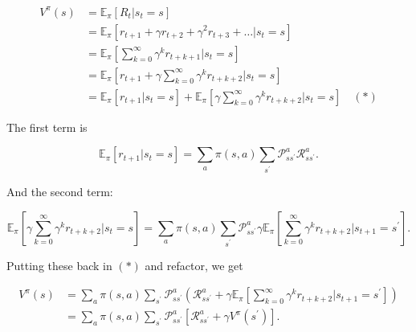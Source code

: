 \documentclass[12pt]{article}
\theoremstyle{plain}
\theoremstyle{definition}
\theoremstyle{remark}
\begin{document}
\begin{align*}
V ^ { \pi } ( s ) &= \mathbb { E } _ { \pi } \left[ R _ { t } | s _ { t } = s \right] \\
&= \mathbb { E } _ { \pi } \left[ r _ { t + 1 } + \gamma r _ { t + 2 } + \gamma ^ { 2 } r _ { t + 3 } + \ldots | s _ { t } = s \right] \\
&= \mathbb { E } _ { \pi } \left[ \sum _ { k = 0 } ^ { \infty } \gamma ^ { k } r _ { t + k + 1 } \bigg| s _ { t } = s \right] \\
&= \mathbb { E } _ { \pi } \left[ r _ { t + 1 } + \gamma \sum _ { k = 0 } ^ { \infty } \gamma ^ { k } r _ { t + k + 2 } \bigg| s _ { t } = s \right] \\
&= \mathbb { E } _ { \pi } \left[ r _ { t + 1 } | s _ { t } = s \right] + \mathbb { E } _ { \pi } \left[ \gamma \sum _ { k = 0 } ^ { \infty } \gamma ^ { k } r _ { t + k + 2 } \bigg| s _ { t } = s \right] \quad (*)
\end{align*}

The first term is

\[
\mathbb { E } _ { \pi } \left[ r _ { t + 1 } | s _ { t } = s \right] = \sum _ { a } \pi ( s , a ) \sum _ { s ^ { \prime } } \mathcal { P } _ { s s ^ { \prime } } ^ { a } \mathcal { R } _ { s s ^ { \prime } } ^ { a }.
\]

And the second term:

\[
\mathbb { E } _ { \pi } \left[ \gamma \sum _ { k = 0 } ^ { \infty } \gamma ^ { k } r _ { t + k + 2 } \bigg| s _ { t } = s \right] = \sum _ { a } \pi ( s , a ) \sum _ { s ^ { \prime } } \mathcal { P } _ { s s ^ { \prime } } ^ { a } \gamma \mathbb { E } _ { \pi } \left[ \sum _ { k = 0 } ^ { \infty } \gamma ^ { k } r _ { t + k + 2 } \bigg| s _ { t + 1 } = s ^ { \prime } \right].
\]

Putting these back in \( (*) \) and refactor, we get

\begin{align*}
V ^ { \pi } ( s ) &= \sum _ { a } \pi ( s , a ) \sum _ { s ^ { \prime } } \mathcal { P } _ { s s ^ { \prime } } ^ { a } \left( \mathcal { R } _ { s s ^ { \prime } } ^ { a } + \gamma \mathbb { E } _ { \pi } \left[ \sum _ { k = 0 } ^ { \infty } \gamma ^ { k } r _ { t + k + 2 } \bigg| s _ { t + 1 } = s ^ { \prime } \right] \right) \\
&= \sum _ { a } \pi ( s , a ) \sum _ { s ^ { \prime } } \mathcal { P } _ { s s ^ { \prime } } ^ { a } \left[ \mathcal { R } _ { s s ^ { \prime } } ^ { a } + \gamma V ^ { \pi } \left( s ^ { \prime } \right) \right].
\end{align*}
\end{document}
